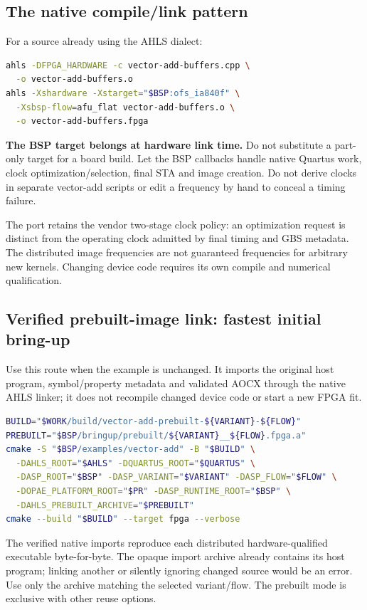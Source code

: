 \documentclass[11pt,letterpaper]{article}
\newcommand{\code}[1]{{\ttfamily\expandafter\seqsplit\expandafter{\detokenize{#1}}}}
\newcommand{\src}[1]{\cite{S#1}}
\begin{document}
\subsection{The native compile/link pattern}
For a source already using the AHLS dialect:
\begin{lstlisting}[language=bash]
ahls -DFPGA_HARDWARE -c vector-add-buffers.cpp \
  -o vector-add-buffers.o
ahls -Xshardware -Xstarget="$BSP:ofs_ia840f" \
  -Xsbsp-flow=afu_flat vector-add-buffers.o \
  -o vector-add-buffers.fpga
\end{lstlisting}
\textbf{The BSP target belongs at hardware link time.} Do not substitute a
part-only target for a board build. Let the BSP callbacks handle native Quartus
work, clock optimization/selection, final STA and image creation. Do not derive
clocks in separate vector-add scripts or edit a frequency by hand to conceal
a timing failure.\src{11}

The port retains the vendor two-stage clock policy: an optimization request
is distinct from the operating clock admitted by final timing and GBS metadata.
The distributed image frequencies are not guaranteed frequencies for arbitrary
new kernels. Changing device code requires its own compile and numerical
qualification.

\subsection{Verified prebuilt-image link: fastest initial bring-up}
Use this route when the example is unchanged. It imports the original host
program, symbol/property metadata and validated AOCX through the native AHLS
linker; it does not recompile changed device code or start a new FPGA fit.
\begin{lstlisting}[language=bash]
BUILD="$WORK/build/vector-add-prebuilt-${VARIANT}-${FLOW}"
PREBUILT="$BSP/bringup/prebuilt/${VARIANT}__${FLOW}.fpga.a"
cmake -S "$BSP/examples/vector-add" -B "$BUILD" \
  -DAHLS_ROOT="$AHLS" -DQUARTUS_ROOT="$QUARTUS" \
  -DASP_ROOT="$BSP" -DASP_VARIANT="$VARIANT" -DASP_FLOW="$FLOW" \
  -DOPAE_PLATFORM_ROOT="$PR" -DASP_RUNTIME_ROOT="$BSP" \
  -DAHLS_PREBUILT_ARCHIVE="$PREBUILT"
cmake --build "$BUILD" --target fpga --verbose
\end{lstlisting}
The verified native imports reproduce each distributed hardware-qualified
executable byte-for-byte. The opaque import archive already contains its host
program; linking another \code{main} or silently ignoring changed source would
be an error. Use only the archive matching the selected variant/flow. The
prebuilt mode is exclusive with other reuse options.\src{11}
\end{document}
